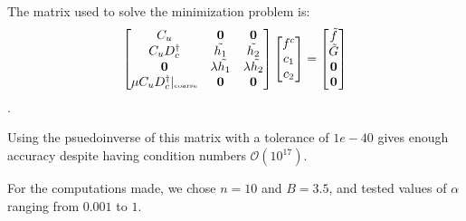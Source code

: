 \documentclass[11pt]{amsart}
\begin{document}
The matrix used to solve the minimization problem is:
\begin{equation}
\begin{bmatrix}
C_u & \mathbf{0} & \mathbf{0}\\
C_u D_c^{\dagger} & \tilde{h_1} & \tilde{h_2} \\
\mathbf{0} & \lambda \tilde{h_1} & \lambda \tilde{h_2} \\
\mu C_u D_c^{\dagger}|_{\text{\tiny{coarse}}} & \mathbf{0} & \mathbf{0}
\end{bmatrix}
\begin{bmatrix}
f^c \\
c_1\\
c_2
\end{bmatrix}
= 
\begin{bmatrix}
\tilde{f} \\
\tilde{G}\\
\mathbf{0}\\
\mathbf{0}
\end{bmatrix}
\end{equation}.  

Using the psuedoinverse of this matrix with a tolerance of $1e-40$ gives enough accuracy despite having condition numbers $\mathcal{O}(10^{17})$.  

For the computations made, we chose $n=10$ and $B=3.5$, and tested values of $\alpha$ ranging from $0.001$ to $1$.  
\end{document}
